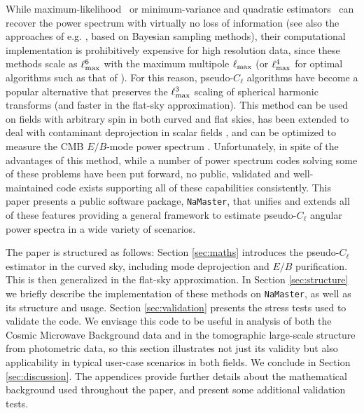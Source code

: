 \documentclass[usenatbib]{mnrasb}
\newcommand{\nmt}{{\tt NaMaster}}
\begin{document}
    While maximum-likelihood~\citep{1998PhRvD..57.2117B,2003PhRvD..67b3001W} or minimum-variance and quadratic estimators~\citep{1997PhRvD..55.5895T,2000MNRAS.317L..23H,2001PhRvD..64f3001T} can recover the power spectrum with virtually no loss of information (see also the approaches of e.g. \cite{2004ApJS..155..227E,2008MNRAS.389.1284T,2016MNRAS.455.4452A}, based on Bayesian sampling methods), their computational implementation is prohibitively expensive for high resolution data, since these methods scale as $\ell_{\rm max}^6$ with the maximum multipole $\ell_{\rm max}$ (or $\ell_{\rm max}^4$ for optimal algorithms such as that of \cite{2003PhRvD..67b3001W}). For this reason, pseudo-$C_\ell$ algorithms \citep{1973ApJ...185..413P,2001PhRvD..64h3003W,2001ApJ...561L..11S,2001PhRvD..64h3003W,2002ApJ...567....2H,2002MNRAS.336.1304H,2004MNRAS.350..914C} have become a popular alternative that preserves the $\ell_{\rm max}^3$ scaling of spherical harmonic transforms (and faster in the flat-sky approximation). This method can be used on fields with arbitrary spin \citep{2003ApJS..148..161K} in both curved and flat skies, has been extended to deal with contaminant deprojection in scalar fields \citep{2017MNRAS.465.1847E}, and can be optimized to measure the CMB $E/B$-mode power spectrum \citep{2002PhRvD..65b3505L,2003PhRvD..67b3501B,2006PhRvD..74h3002S,2009PhRvD..79l3515G,2011PhRvD..83h3003B}. Unfortunately, in spite of the advantages of this method, while a number of power spectrum codes solving some of these problems have been put forward, no public, validated and well-maintained code exists supporting all of these capabilities consistently. This paper presents a public software package, \nmt, that unifies and extends all of these features providing a general framework to estimate pseudo-$C_\ell$ angular power spectra in a wide variety of scenarios.
    
    The paper is structured as follows: Section \ref{sec:maths} introduces the pseudo-$C_\ell$ estimator in the curved sky, including mode deprojection and $E/B$ purification. This is then generalized in the flat-sky approximation. In Section \ref{sec:structure} we briefly describe the implementation of these methods on \nmt, as well as its structure and usage. Section \ref{sec:validation} presents the stress tests used to validate the code. We envisage this code to be useful in analysis of both the Cosmic Microwave Background data and in the tomographic large-scale structure from photometric data, so this section illustrates not just its validity but also applicability in typical user-case scenarios in both fields. We conclude in Section \ref{sec:discussion}. The appendices provide further details about the mathematical background used throughout the paper, and present some additional validation tests.
    
\end{document}
